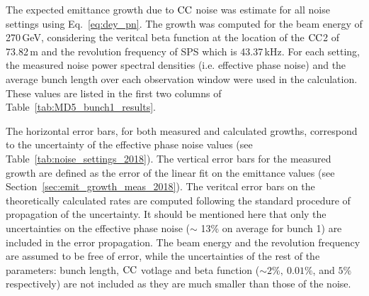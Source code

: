 The expected emittance growth due to ${\mathrm{CC}}$ noise was estimate for all noise settings using Eq.~\eqref{eq:dey_pn}. The growth was computed for the beam energy of 270\,GeV, considering the veritcal beta function at the location of the ${\mathrm{CC}}$2 of 73.82\,m and the revolution frequency of SPS which is 43.37\,kHz. For each setting, the measured noise power spectral densities (i.e. effective phase noise) and the average bunch length over each observation window were used in the calculation. These values are listed in the first two columns of Table~\ref{tab:MD5_bunch1_results}.

The horizontal error bars, for both measured and calculated growths, correspond to the uncertainty of the effective phase noise values (see Table~\ref{tab:noise_settings_2018}). The vertical error bars for the measured growth are defined as the error of the linear fit on the emittance values (see Section~\ref{sec:emit_growth_meas_2018}). The veritcal error bars on the theoretically calculated rates are computed following the standard procedure of propagation of the uncertainty. It should be mentioned here that only the uncertainties on the effective phase noise ($\sim$ 13\% on average for bunch 1) are included in the error propagation. The beam energy and the revolution frequency are assumed to be free of error, while the uncertainties of the rest of the parameters: bunch length, ${\mathrm{CC}}$ votlage and beta function ($\sim 2 \%, \ 0.01 \%$, and $5 \%$ respectively) are not included as they are much smaller than those of the noise.




